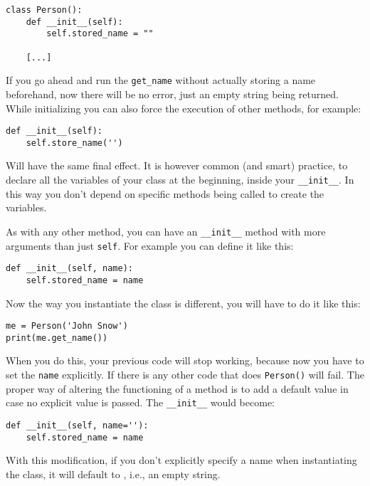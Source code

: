 \begin{verbatim}
class Person():
    def __init__(self):
        self.stored_name = ""

    [...]
\end{verbatim}

If you go ahead and run the \texttt{get_name} without actually storing
a name beforehand, now there will be no error, just an empty string
being returned. While initializing you can also force the execution of
other methods, for example:

\begin{verbatim}
def __init__(self):
    self.store_name('')
\end{verbatim}

Will have the same final effect. It is however common (and smart)
practice, to declare all the variables of your class at the beginning,
inside your \texttt{__init__}. In this way you don't depend on
specific methods being called to create the variables. 

As with any other method, you can have an \texttt{__init__} method with more
arguments than just \texttt{self}. For example you can define it like
this:

\begin{verbatim}
def __init__(self, name):
    self.stored_name = name
\end{verbatim}

Now the way you instantiate the class is different, you will have to do
it like this:

\begin{verbatim}
me = Person('John Snow')
print(me.get_name())
\end{verbatim}

When you do this, your previous code will stop working, because now you have to set the \texttt{name} explicitly. If there is any other code that does \texttt{Person()} will fail. The proper way of altering the functioning of a method is to add a default value in case no explicit value is passed. The \texttt{__init__} would become:

\begin{verbatim}
def __init__(self, name=''):
    self.stored_name = name
\end{verbatim}

With this modification, if you don't explicitly specify a name when instantiating the class, it will default to , i.e., an empty string.

